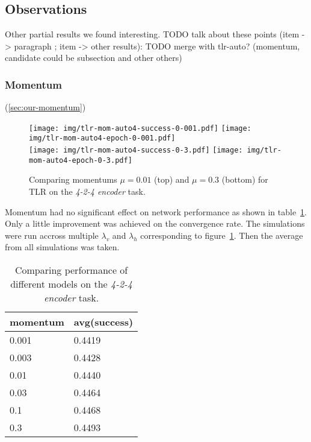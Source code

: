 
\subsection{Observations}
\label{sec:results-other} 

Other partial results we found interesting. 
TODO talk about these points (item -> paragraph ; item -> other results): 
TODO merge with tlr-auto? (momentum, candidate could be subsection and other others) 

 

\subsubsection{Momentum}
\label{sec:results-momentum} 

(\ref{sec:our-momentum}) 

\begin{figure}[H]
  \centering
  \texttt{[image: img/tlr-mom-auto4-success-0-001.pdf]}  
  \texttt{[image: img/tlr-mom-auto4-epoch-0-001.pdf]}  \\
  \texttt{[image: img/tlr-mom-auto4-success-0-3.pdf]}  
  \texttt{[image: img/tlr-mom-auto4-epoch-0-3.pdf]}  
  \caption{Comparing momentums $\mu=0.01$ (top) and $\mu=0.3$ (bottom) for TLR on the \emph{4-2-4 encoder} task.}
  \label{fig:results-tlr-auto4-momentum}
\end{figure}

Momentum had no significant effect on network performance as shown in table~\ref{tab:results-mom-auto4}. Only a little improvement was achieved on the convergence rate. The simulations were run accross multiple $\lambda_v$ and $\lambda_h$ corresponding to figure~\ref{fig:results-tlr-auto4-momentum}. Then the average from all simulations was taken. 
\begin{table}[H] 
  \centering
  {\small
    \begin{tabular}{|l|l|}
    \hline
momentum & avg(success) \\
    \hline
0.001  & 0.4419 \\
    \hline
0.003  & 0.4428 \\
    \hline
0.01   & 0.4440 \\
    \hline
0.03   & 0.4464 \\
    \hline
0.1    & 0.4468 \\
    \hline
0.3    & 0.4493 \\
    \hline
    \end{tabular}
  }
  \caption{Comparing performance of different models on the \emph{4-2-4 encoder} task.} 
  \label{tab:results-mom-auto4}
\end{table}


 
